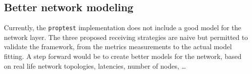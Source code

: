 \subsection{Better network modeling}
Currently, the \texttt{proptest} implementation does not include a good model
for the network layer. The three proposed receiving strategies are naive but
permitted to validate the framework, from the metrics measurements to the actual
model fitting. A step forward would be to create better models for the
network, based on real life network topologies, latencies, number of nodes, \ldots

